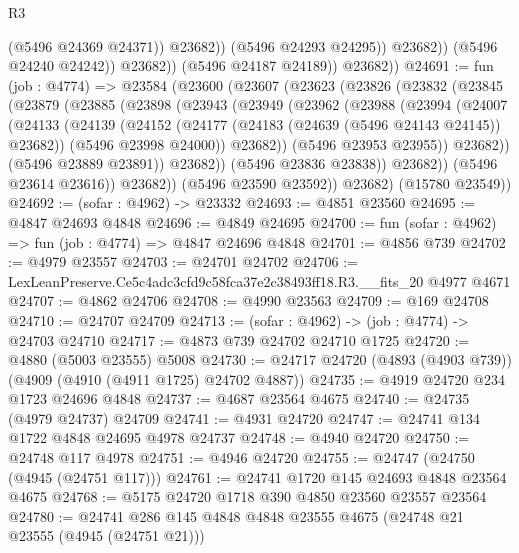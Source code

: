 \begin{lexlean}{R3}
\begin{coremodule}
                            (@5496 @24369 @24371))
                          @23682))
                      (@5496 @24293 @24295))
                    @23682))
                (@5496 @24240 @24242))
              @23682))
          (@5496 @24187 @24189))
        @23682))
@24691 := fun (job : @4774) =>
  @23584
    (@23600
      (@23607
        (@23623
          (@23826
            (@23832
              (@23845
                (@23879
                  (@23885
                    (@23898
                      (@23943
                        (@23949
                          (@23962
                            (@23988
                              (@23994
                                (@24007
                                  (@24133
                                    (@24139
                                      (@24152
                                        (@24177 (@24183 (@24639 (@5496 @24143 @24145)) @23682))
                                        (@5496 @23998 @24000))
                                      @23682))
                                  (@5496 @23953 @23955))
                                @23682))
                            (@5496 @23889 @23891))
                          @23682))
                      (@5496 @23836 @23838))
                    @23682))
                (@5496 @23614 @23616))
              @23682))
          (@5496 @23590 @23592))
        @23682)
      (@15780 @23549))
@24692 := (sofar : @4962) -> @23332
@24693 := @4851 @23560
@24695 := @4847 @24693 @4848
@24696 := @4849 @24695
@24700 := fun (sofar : @4962) => fun (job : @4774) => @4847 @24696 @4848
@24701 := @4856 @739
@24702 := @4979 @23557
@24703 := @24701 @24702
@24706 := LexLeanPreserve.Ce5c4adc3cfd9c58fca37e2c38493ff18.R3.__fits_20 @4977 @4671
@24707 := @4862 @24706
@24708 := @4990 @23563
@24709 := @169 @24708
@24710 := @24707 @24709
@24713 := (sofar : @4962) -> (job : @4774) -> @24703 @24710
@24717 := @4873 @739 @24702 @24710 @1725
@24720 := @4880 (@5003 @23555) @5008
@24730 := @24717 @24720 (@4893 (@4903 @739)) (@4909 (@4910 (@4911 @1725) @24702 @4887))
@24735 := @4919 @24720 @234 @1723 @24696 @4848
@24737 := @4687 @23564 @4675
@24740 := @24735 (@4979 @24737) @24709
@24741 := @4931 @24720
@24747 := @24741 @134 @1722 @4848 @24695 @4978 @24737
@24748 := @4940 @24720
@24750 := @24748 @117 @4978
@24751 := @4946 @24720
@24755 := @24747 (@24750 (@4945 (@24751 @117)))
@24761 := @24741 @1720 @145 @24693 @4848 @23564 @4675
@24768 := @5175 @24720 @1718 @390 @4850 @23560 @23557 @23564
@24780 := @24741 @286 @145 @4848 @4848 @23555 @4675 (@24748 @21 @23555 (@4945 (@24751 @21)))

\end{coremodule}
\end{lexlean}
